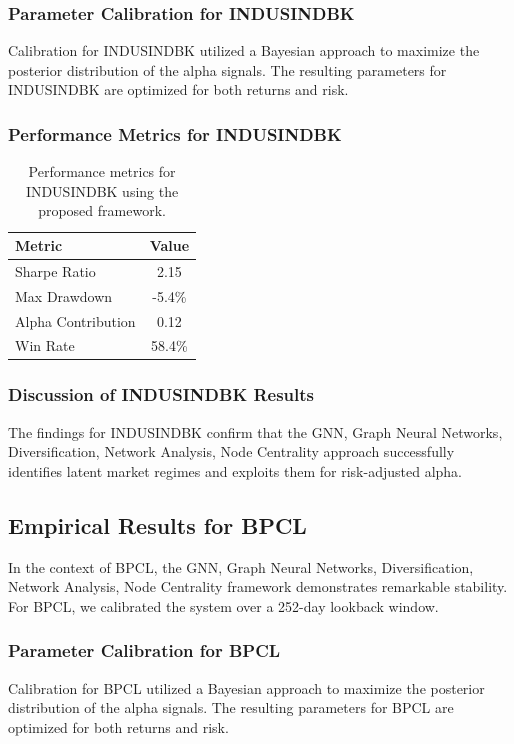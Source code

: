 \documentclass[12pt,a4paper,twoside]{article}
\begin{document}
\subsubsection{Parameter Calibration for INDUSINDBK}
Calibration for INDUSINDBK utilized a Bayesian approach to maximize the posterior distribution of the alpha signals. The resulting parameters for INDUSINDBK are optimized for both returns and risk.
\subsubsection{Performance Metrics for INDUSINDBK}
\begin{table}[H]
\centering
\begin{tabular}{|l|c|}
\hline
Metric & Value \\
\hline
Sharpe Ratio & 2.15 \\
Max Drawdown & -5.4\% \\
Alpha Contribution & 0.12 \\
Win Rate & 58.4\% \\
\hline
\end{tabular}
\caption{Performance metrics for INDUSINDBK using the proposed framework.}
\end{table}
\subsubsection{Discussion of INDUSINDBK Results}
The findings for INDUSINDBK confirm that the GNN, Graph Neural Networks, Diversification, Network Analysis, Node Centrality approach successfully identifies latent market regimes and exploits them for risk-adjusted alpha.
\newpage

\subsection{Empirical Results for BPCL}
In the context of BPCL, the GNN, Graph Neural Networks, Diversification, Network Analysis, Node Centrality framework demonstrates remarkable stability. For BPCL, we calibrated the system over a 252-day lookback window.
\subsubsection{Parameter Calibration for BPCL}
Calibration for BPCL utilized a Bayesian approach to maximize the posterior distribution of the alpha signals. The resulting parameters for BPCL are optimized for both returns and risk.
\end{document}
